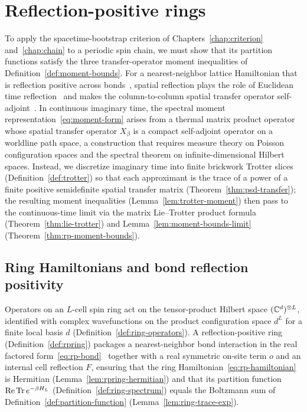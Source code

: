 \chapter{Reflection-positive rings}
\label{chap:rings}

To apply the spacetime-bootstrap criterion of Chapters~\ref{chap:criterion} and~\ref{chap:chain} to
a periodic spin chain, we must show that its partition functions satisfy the three
transfer-operator moment inequalities of Definition~\ref{def:moment-bounds}. For a nearest-neighbor
lattice Hamiltonian that is reflection positive across bonds~\cite{Osterwalder1973Axioms,
Osterwalder1975Axioms, Dyson1978Phase, Frohlich1978Phase, Biskup2009Reflection,
Jaffe2016Characterization}, spatial reflection plays the role of Euclidean time
reflection~\cite{Luscher1977Construction} and makes the column-to-column spatial transfer operator
self-adjoint~\cite{Suzuki1985Transfermatrix, TangTuWang}. In continuous imaginary time,
the spectral moment representation~\eqref{eq:moment-form} arises from a thermal matrix product
operator whose spatial transfer operator \(X_\beta\) is a compact self-adjoint operator on a
worldline path space, a construction that requires measure theory on Poisson configuration spaces
and the spectral theorem on infinite-dimensional Hilbert spaces. Instead, we discretize imaginary
time into finite brickwork Trotter slices~\cite{Suzuki1985Transfermatrix} (Definition~\ref{def:trotter})
so that each approximant is the trace of a power of a finite positive semidefinite spatial transfer
matrix (Theorem~\ref{thm:psd-transfer}); the resulting moment inequalities
(Lemma~\ref{lem:trotter-moment}) then pass to the continuous-time limit via the matrix
Lie--Trotter product formula (Theorem~\ref{thm:lie-trotter}) and
Lemma~\ref{lem:moment-bounds-limit} (Theorem~\ref{thm:rp-moment-bounds}).

\section{Ring Hamiltonians and bond reflection positivity}

Operators on an \(L\)-cell spin ring act on the tensor-product Hilbert space \((\mathbb{C}^d)^{\otimes L}\),
identified with complex wavefunctions on the product configuration space \(d^L\) for a finite local
basis \(d\) (Definition~\ref{def:ring-operators}). A reflection-positive ring
(Definition~\ref{def:rpring}) packages a nearest-neighbor bond interaction in the real factored
form~\eqref{eq:rp-bond}~\cite{Dyson1978Phase, Frohlich1978Phase} together with a real
symmetric on-site term \(o\) and an internal cell reflection \(F\), ensuring that the ring
Hamiltonian~\eqref{eq:rp-hamiltonian} is Hermitian (Lemma~\ref{lem:rpring-hermitian}) and that its
partition function \(\operatorname{Re}\operatorname{Tr} e^{-\beta H_L}\) (Definition~\ref{def:ring-spectrum})
equals the Boltzmann sum of Definition~\ref{def:partition-function} (Lemma~\ref{lem:ring-trace-exp}).

